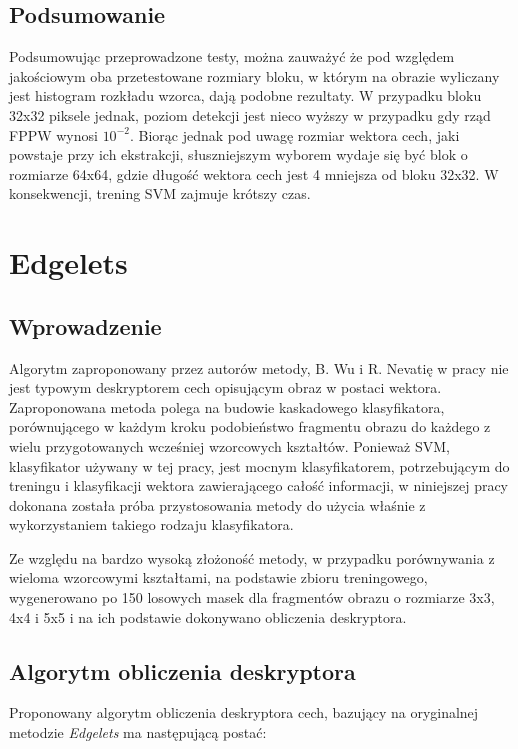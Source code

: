 \subsection{Podsumowanie}
Podsumowując przeprowadzone testy, można zauważyć że pod względem jakościowym oba przetestowane rozmiary bloku, w którym na obrazie wyliczany jest histogram rozkładu wzorca, dają podobne rezultaty. W przypadku bloku 32x32 piksele jednak, poziom detekcji jest nieco wyższy w przypadku gdy rząd FPPW wynosi $10^{-2}$. Biorąc jednak pod uwagę rozmiar wektora cech, jaki powstaje przy ich ekstrakcji, słuszniejszym wyborem wydaje się być blok o rozmiarze 64x64, gdzie długość wektora cech jest 4 mniejsza od bloku 32x32. W konsekwencji, trening SVM zajmuje krótszy czas.

\clearpage

\section{Edgelets}
\label{sec:edge}

\subsection{Wprowadzenie}
Algorytm zaproponowany przez autorów metody, B. Wu i R. Nevatię w pracy \cite{Wu05} nie jest typowym deskryptorem cech opisującym obraz w postaci wektora. Zaproponowana metoda polega na budowie kaskadowego klasyfikatora, porównującego w każdym kroku podobieństwo fragmentu obrazu do każdego z wielu przygotowanych wcześniej wzorcowych kształtów. Ponieważ SVM, klasyfikator używany w tej pracy, jest mocnym klasyfikatorem, potrzebującym do treningu i klasyfikacji wektora zawierającego całość informacji, w niniejszej pracy dokonana została próba przystosowania metody do użycia właśnie z wykorzystaniem takiego rodzaju klasyfikatora.

Ze względu na bardzo wysoką złożoność metody, w przypadku porównywania z wieloma wzorcowymi kształtami, na podstawie zbioru treningowego, wygenerowano po 150 losowych masek dla fragmentów obrazu o rozmiarze 3x3, 4x4 i 5x5 i na ich podstawie dokonywano obliczenia deskryptora.


\subsection{Algorytm obliczenia deskryptora}

Proponowany algorytm obliczenia deskryptora cech, bazujący na oryginalnej metodzie \textit{Edgelets} ma następującą postać:

